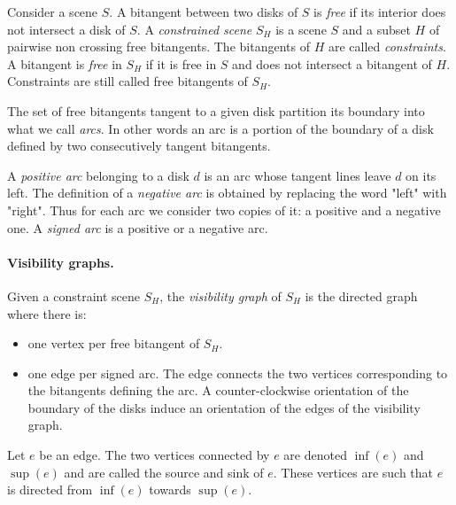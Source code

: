 Consider a scene $S$. A bitangent between two disks of $S$ is \emph{free} if its
interior does not intersect a disk of $S$.  A \emph{constrained scene} $S_H$ is
a scene $S$ and a subset $H$ of pairwise non crossing free bitangents. The
bitangents of $H$ are called \emph{constraints}. A bitangent is \emph{free} in
$S_H$ if it is free in $S$ and does not intersect a bitangent of $H$.
Constraints are still called free bitangents of $S_H$.

The set of free bitangents tangent to a given disk partition its boundary into
what we call \emph{arcs}. In other words an arc is a portion of the boundary of
a disk defined by two consecutively tangent bitangents.

A \emph{positive arc} belonging to a disk $d$ is an arc whose tangent lines leave 
$d$ on its left. The definition of a \emph{negative arc} is obtained by
replacing the word "left" with "right". Thus for each arc we consider two
copies of it: a positive and a negative one. A \emph{signed arc} is a positive
or a negative arc.

\paragraph{Visibility graphs. }
Given a constraint scene $S_H$, the \emph{visibility graph} of $S_H$ is the
directed graph where there is:
\begin{itemize}
    \item one vertex per free bitangent of $S_H$.
    \item one edge per signed arc. The edge connects the two vertices
    corresponding to the bitangents defining the arc. A counter-clockwise
    orientation of the boundary of the disks induce an orientation of the edges
    of the visibility graph.
\end{itemize}
Let $e$ be an edge. The two vertices connected by $e$ are denoted $\inf(e)$ and
$\sup(e)$ and are called the source and sink of $e$. These vertices are such
that $e$ is directed from $\inf(e)$ towards $\sup(e)$.

